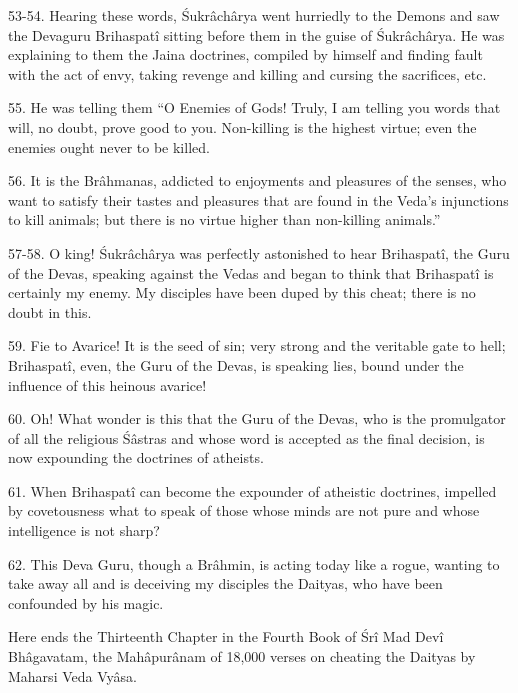 53-54. Hearing these words, \'Sukr\^ach\^arya went hurriedly to the Demons and saw the Devaguru Brihaspat\^i sitting before them in the guise of \'Sukr\^ach\^arya. He was explaining to them the Jaina doctrines, compiled by himself and finding fault with the act of envy, taking revenge and killing and cursing the sacrifices, etc.

55. He was telling them ``O Enemies of Gods! Truly, I am telling you words that will, no doubt, prove good to you. Non-killing is the highest virtue; even the enemies ought never to be killed.

56. It is the Br\^ahmanas, addicted to enjoyments and pleasures of the senses, who want to satisfy their tastes and pleasures that are found in the Veda's injunctions to kill animals; but there is no virtue higher than non-killing animals.''

57-58. O king! \'Sukr\^ach\^arya was perfectly astonished to hear Brihaspat\^i, the Guru of the Devas, speaking against the Vedas and began to think that Brihaspat\^i is certainly my enemy. My disciples have been duped by this cheat; there is no doubt in this.

59. Fie to Avarice! It is the seed of sin; very strong and the veritable gate to hell; Brihaspat\^i, even, the Guru of the Devas, is speaking lies, bound under the influence of this heinous avarice!

60. Oh! What wonder is this that the Guru of the Devas, who is the promulgator of all the religious \'S\^astras and whose word is accepted as the final decision, is now expounding the doctrines of atheists.

61. When Brihaspat\^i can become the expounder of atheistic doctrines, impelled by covetousness what to speak of those whose minds are not pure and whose intelligence is not sharp?

62. This Deva Guru, though a Br\^ahmin, is acting today like a rogue, wanting to take away all and is deceiving my disciples the Daityas, who have been confounded by his magic.

Here ends the Thirteenth Chapter in the Fourth Book of \'Sr\^i Mad Dev\^i Bh\^agavatam, the Mah\^apur\^anam of 18,000 verses on cheating the Daityas by Maharsi Veda Vy\^asa.